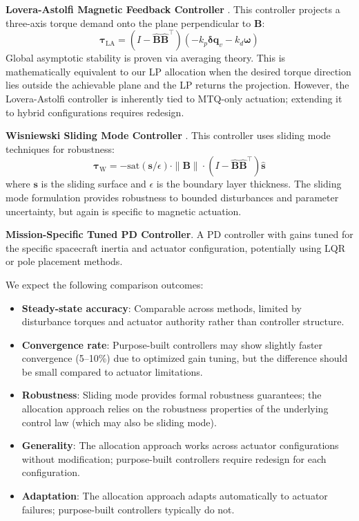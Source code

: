 \documentclass[conference]{IEEEtran}
\begin{document}
\textbf{Lovera-Astolfi Magnetic Feedback Controller} \cite{lovera_spacecraft_2004, lovera_global_2005}. This controller projects a three-axis torque demand onto the plane perpendicular to $\mathbf{B}$:
\begin{equation}
\boldsymbol{\tau}_{\text{LA}} = (I - \hat{\mathbf{B}}\hat{\mathbf{B}}^\top)(-k_p \mathbf{\delta q}_v - k_d \boldsymbol{\omega})
\end{equation}
Global asymptotic stability is proven via averaging theory. This is mathematically equivalent to our LP allocation when the desired torque direction lies outside the achievable plane and the LP returns the projection. However, the Lovera-Astolfi controller is inherently tied to MTQ-only actuation; extending it to hybrid configurations requires redesign.

\textbf{Wisniewski Sliding Mode Controller} \cite{wisniewski_satellite_1997}. This controller uses sliding mode techniques for robustness:
\begin{equation}
\boldsymbol{\tau}_{\text{W}} = -\text{sat}(\mathbf{s}/\epsilon) \cdot \|\mathbf{B}\| \cdot (I - \hat{\mathbf{B}}\hat{\mathbf{B}}^\top)\hat{\mathbf{s}}
\end{equation}
where $\mathbf{s}$ is the sliding surface and $\epsilon$ is the boundary layer thickness. The sliding mode formulation provides robustness to bounded disturbances and parameter uncertainty, but again is specific to magnetic actuation.

\textbf{Mission-Specific Tuned PD Controller}. A PD controller with gains tuned for the specific spacecraft inertia and actuator configuration, potentially using LQR or pole placement methods.

We expect the following comparison outcomes:
\begin{itemize}
    \item \textbf{Steady-state accuracy}: Comparable across methods, limited by disturbance torques and actuator authority rather than controller structure.
    \item \textbf{Convergence rate}: Purpose-built controllers may show slightly faster convergence (5--10\%) due to optimized gain tuning, but the difference should be small compared to actuator limitations.
    \item \textbf{Robustness}: Sliding mode provides formal robustness guarantees; the allocation approach relies on the robustness properties of the underlying control law (which may also be sliding mode).
    \item \textbf{Generality}: The allocation approach works across actuator configurations without modification; purpose-built controllers require redesign for each configuration.
    \item \textbf{Adaptation}: The allocation approach adapts automatically to actuator failures; purpose-built controllers typically do not.
\end{itemize}
\end{document}
